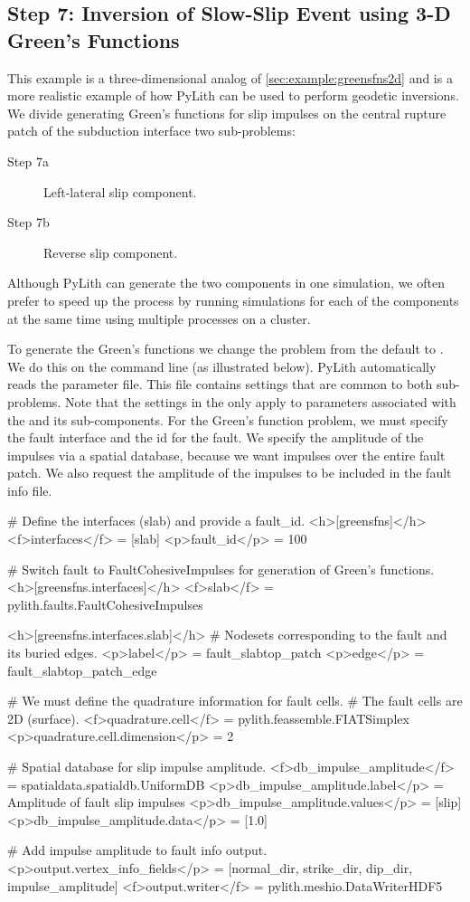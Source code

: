 \subsection{Step 7: Inversion of Slow-Slip Event using 3-D Green's Functions}

This example is a three-dimensional analog of
\vref{sec:example:greensfns2d} and is a more realistic example of how
PyLith can be used to perform geodetic inversions. We divide
generating Green's functions for slip impulses on the central rupture
patch of the subduction interface two sub-problems:
\begin{description}
 \item[Step 7a] Left-lateral slip component.
 \item[Step 7b] Reverse slip component.
\end{description}
Although PyLith can generate the two components in one simulation, we
often prefer to speed up the process by running simulations for each
of the components at the same time using multiple processes on a cluster.

To generate the Green's functions we change the problem from the
default  to . We do this on
the command line (as illustrated below). PyLith automatically reads
the  parameter file. This file contains
settings that are common to both sub-problems. Note that the settings
in the  only apply to parameters associated
with the  and its sub-components. For the Green's
function problem, we must specify the fault interface and the id for
the fault. We specify the amplitude of the impulses via a
 spatial database, because we want impulses over the
entire fault patch. We also request the amplitude of the impulses to
be included in the fault info file.
\begin{cfg}
# Define the interfaces (slab) and provide a fault_id.
<h>[greensfns]</h>
<f>interfaces</f> = [slab]
<p>fault_id</p> = 100

# Switch fault to FaultCohesiveImpulses for generation of Green's functions.
<h>[greensfns.interfaces]</h>
<f>slab</f> = pylith.faults.FaultCohesiveImpulses

<h>[greensfns.interfaces.slab]</h>
# Nodesets corresponding to the fault and its buried edges.
<p>label</p> = fault_slabtop_patch
<p>edge</p> = fault_slabtop_patch_edge

# We must define the quadrature information for fault cells.
# The fault cells are 2D (surface).
<f>quadrature.cell</f> = pylith.feassemble.FIATSimplex
<p>quadrature.cell.dimension</p> = 2

# Spatial database for slip impulse amplitude.
<f>db_impulse_amplitude</f> = spatialdata.spatialdb.UniformDB
<p>db_impulse_amplitude.label</p> = Amplitude of fault slip impulses
<p>db_impulse_amplitude.values</p> = [slip]
<p>db_impulse_amplitude.data</p> = [1.0]

# Add impulse amplitude to fault info output.
<p>output.vertex_info_fields</p> = [normal_dir, strike_dir, dip_dir, impulse_amplitude]
<f>output.writer</f> = pylith.meshio.DataWriterHDF5
\end{cfg}


